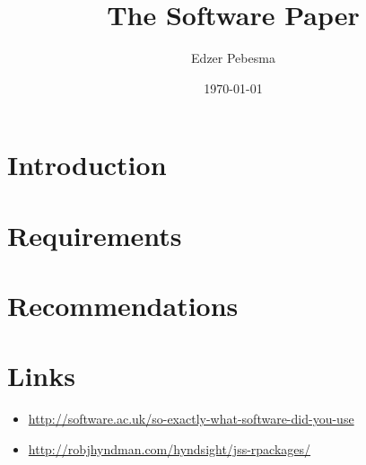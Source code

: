 \documentclass{article}
\author{Edzer Pebesma}
\date{\today}
\title{\bf The Software Paper}
\begin{document}
\maketitle

\section{Introduction}
\section{Requirements}
\section{Recommendations}
\section{Links}

\begin{itemize}
\item \url{http://software.ac.uk/so-exactly-what-software-did-you-use}
\item \url{http://robjhyndman.com/hyndsight/jss-rpackages/}
\end{itemize}
\end{document}
